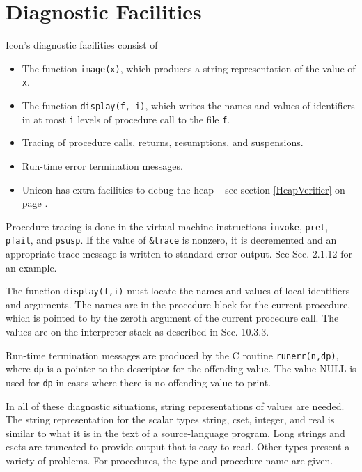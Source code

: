 
\section{Diagnostic Facilities}

Icon's diagnostic facilities consist of

\liststyleLxvii
\begin{itemize}

\item The function \texttt{image(x)}, which produces a string
representation of the value of \texttt{x}.

\item The function \texttt{display(f, i)}, which writes the names and
values of identifiers in at most \texttt{i} levels of procedure call
to the file \texttt{f}.

\item Tracing of procedure calls, returns, resumptions, and suspensions.

\item Run-time error termination messages.

\item {\color{blue} Unicon has extra facilities to debug the heap
  -- see section \ref{HeapVerifier} on page \pageref{HeapVerifier}.}

\end{itemize}

Procedure tracing is done in the virtual machine instructions \texttt{invoke},
\texttt{pret}, \texttt{pfail}, and \texttt{psusp}. If the value of \texttt{\&trace} is nonzero,
it is decremented and an appropriate trace message is written to
standard error output.  See Sec. 2.1.12 for an example.

The function \texttt{display(f,i)} must locate the names and values of
local identifiers and arguments. The names are in the procedure block
for the current procedure, which is pointed to by the zeroth argument
of the current procedure call. The values are on the interpreter stack
as described in Sec. 10.3.3.

Run-time termination messages are produced by the C routine
\texttt{runerr(n,dp)}, where \texttt{dp} is a pointer to the
descriptor for the offending value. The value NULL is used for
\texttt{dp} in cases where there is no offending value to print.

In all of these diagnostic situations, string representations of
values are needed. The string representation for the
{\textquotedbl}scalar{\textquotedbl} types string, cset, integer, and
real is similar to what it is in the text of a source-language
program. Long strings and csets are truncated to provide output that
is easy to read. Other types present a variety of problems. For
procedures, the type and procedure name are given.

